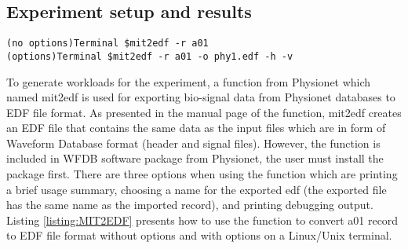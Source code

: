 \subsection{Experiment setup and results}
\begin{lstlisting}[caption={Convert mit2edf by using terminal}, label = {listing:MIT2EDF}, captionpos=b]
(no options)Terminal $mit2edf -r a01 
(options)Terminal $mit2edf -r a01 -o phy1.edf -h -v
\end{lstlisting}
To generate workloads for the experiment, a function from Physionet which named mit2edf is used for exporting bio-signal data from Physionet databases to EDF file format. As presented in the manual page of the function, mit2edf creates an EDF file that contains the same data as the input files which are in form of Waveform Database format (header and signal files). However, the function is included in WFDB software package from Physionet, the user must install the package first. There are three options when using the function which are printing a brief usage summary, choosing a name for the exported edf (the exported file has the same name as the imported record), and printing debugging output. Listing \ref{listing:MIT2EDF} presents how to use the function to convert a01 record to EDF file format without options and with options on a Linux/Unix terminal.
